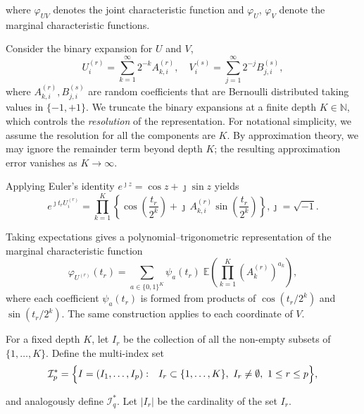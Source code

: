\documentclass[12pt,reqno,oneside]{amsbook}
\theoremstyle{definition}
\theoremstyle{remark}
\begin{document}
where $\varphi_{{U}{V}}$ denotes the joint characteristic function and
$\varphi_{U}$, $\varphi_{V}$ denote the marginal characteristic functions.

Consider the binary expansion for ${U}$ and  ${V}$, 
\[
U_i^{(r)}
=
\sum_{k=1}^{\infty} 2^{-k} A^{(r)}_{k,i},
\quad
V_i^{(s)}
=
\sum_{j=1}^{\infty} 2^{-j} B^{(s)}_{j,i},
\]
where $A^{(r)}_{k,i}, B^{(s)}_{j,i}$ are random coefficients that are Bernoulli distributed taking values in $\{-1, +1\}$.
We truncate the binary expansions at a finite depth $K\in\mathbb N$, which
controls the \emph{resolution} of the representation. For notational simplicity, we assume the resolution for all the components are $K$.
By approximation theory, we may ignore the remainder term beyond depth $K$; the resulting approximation error
vanishes as $K\to\infty$.

Applying Euler's identity $e^{\jmath z} = \cos z + \jmath\sin z$ yields
\[
e^{\jmath t_r U_i^{(r)}}
=
\prod_{k=1}^{K}
\left\{
\cos\!\left( \frac{t_r}{2^k} \right)
+ \jmath\, A_{k,i}^{(r)} \sin\!\left( \frac{t_r}{2^k} \right)
\right\}, \jmath
=\sqrt{-1}.
\]


Taking expectations gives a polynomial--trigonometric representation of the
marginal characteristic function
\[
\varphi_{U^{(r)}}(t_r)
=
\sum_{a \in \{0,1\}^K}
\psi_a(t_r)\;
\mathbb{E}\!\left(
  \prod_{k=1}^{K}
    (A^{(r)}_k)^{a_k}
\right),
\]
where each coefficient $\psi_a(t_r)$ is formed from products of
$\cos(t_r/2^k)$ and $\sin(t_r/2^k)$. The same construction applies to each
coordinate of $V$.

For a fixed depth $K$, let $I_r$ be the collection of all the non-empty subsets of $\{1,\dots,K\}$. 
Define the multi-index set
\[
\mathcal I_p^*
=\Bigl\{
\begin{aligned}
&I=(I_1,\dots,I_p):
&I_r \subset \{1,\dots,K\},\ I_r\neq\emptyset,\ 1\le r\le p
\end{aligned}
\Bigr\},
\]

and analogously define $\mathcal I_q^*$. Let $|I_r|$ be the cardinality of the set $I_r$.
\end{document}
